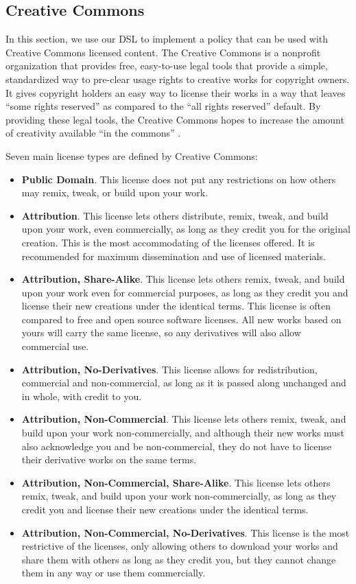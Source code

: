 \subsection{Creative Commons}\label{sec:model-cc}
In this section, we use our DSL to implement a policy that can be used with
Creative Commons licensed content.  The Creative Commons is a nonprofit
organization that provides free, easy-to-use legal tools that provide a simple,
standardized way to pre-clear usage rights to creative works for copyright
owners.  It gives copyright holders an easy way to license their works in a way
that leaves ``some rights reserved'' as compared to the ``all rights reserved''
default.  By providing these legal tools, the Creative Commons hopes to
increase the amount of creativity available ``in the commons'' \cite{creative-commons}.

Seven main license types are defined by Creative Commons:

\begin{itemize}
\item \textbf{Public Domain}. This license does not put any restrictions on how others may remix, tweak, or
build upon your work.
\item \textbf{Attribution}.  This license lets others distribute, remix, tweak, and build upon your work,
even commercially, as long as they credit you for the original creation. This
is the most accommodating of the licenses offered.  It is recommended for
maximum dissemination and use of licensed materials.
\item \textbf{Attribution, Share-Alike}.  This license lets others remix, tweak, and build upon your work even for
commercial purposes, as long as they credit you and license their new creations
under the identical terms.  This license is often compared to free and open
source software licenses.  All new works based on yours will carry the same
license, so any derivatives will also allow commercial use.
\item \textbf{Attribution, No-Derivatives}.  This license allows for redistribution, commercial and non-commercial, as long
as it is passed along unchanged and in whole, with credit to you.
\item \textbf{Attribution, Non-Commercial}.  This license lets others remix, tweak, and build upon your work
non-commercially, and although their new works must also acknowledge you and be
non-commercial, they do not have to license their derivative works on the same
terms.
\item \textbf{Attribution, Non-Commercial, Share-Alike}.  This license lets others remix, tweak, and build upon your work
non-commercially, as long as they credit you and license their new creations
under the identical terms.
\item \textbf{Attribution, Non-Commercial, No-Derivatives}.  This license is the most restrictive of the licenses, only allowing others to
download your works and share them with others as long as they credit you, but
they cannot change them in any way or use them commercially.
\end{itemize}

